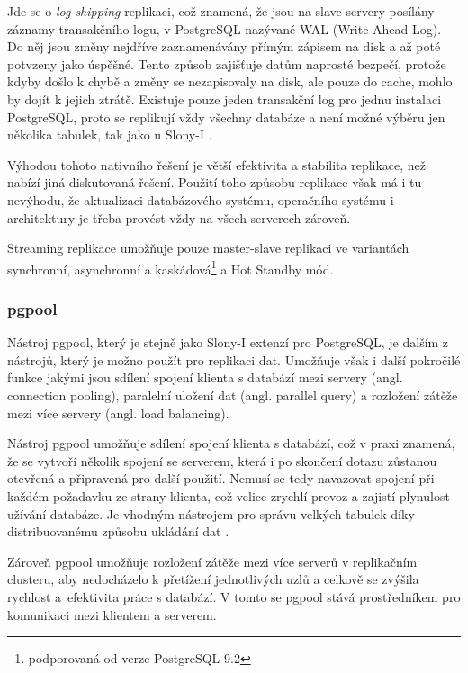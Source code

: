   Jde se o {\it log-shipping} replikaci, což znamená, že jsou na slave servery
  posílány záznamy transakčního logu, v PostgreSQL nazývané WAL (Write Ahead
  Log). Do něj jsou změny nejdříve zaznamenávány přímým zápisem na disk a až
  poté potvzeny jako úspěšné. Tento způsob zajišťuje datům naprosté bezpečí,
  protože kdyby došlo k chybě a změny se nezapisovaly na disk, ale pouze do
  cache, mohlo by dojít k jejich ztrátě. Existuje pouze jeden transakční log
  pro jednu instalaci PostgreSQL, proto se replikují vždy všechny databáze a
  není možné výběru jen několika tabulek, tak jako u Slony-I \citep{Boszormenyi2013}. 
 
  Výhodou tohoto nativního řešení je větší efektivita a stabilita replikace,
  než nabízí jiná diskutovaná řešení. Použití toho způsobu replikace však má i
  tu nevýhodu, že aktualizaci databázového systému, operačního systému i
  architektury je třeba provést vždy na všech serverech zároveň.

  Streaming replikace umožňuje pouze master-slave replikaci ve variantách
  synchronní, asynchronní a kaskádová\footnote{podporovaná od verze PostgreSQL
  9.2} a Hot Standby mód.

      \subsubsection{pgpool}
      \label{kpgpool}

Nástroj pgpool, který je stejně jako Slony-I extenzí pro PostgreSQL, je dalším
z nástrojů, který je možno použít pro replikaci dat. Umožňuje však i další
pokročilé funkce jakými jsou sdílení spojení klienta s databází mezi servery
(angl. connection pooling), paralelní uložení dat (angl. parallel query) a
rozložení zátěže mezi více servery (angl. load balancing). 

Nástroj pgpool umožňuje sdílení spojení klienta s databází, což v praxi
znamená, že se vytvoří několik spojení se serverem, která i po skončení dotazu
zůstanou otevřená a připravená pro další použití. Nemusí se tedy navazovat
spojení při každém požadavku ze strany klienta, což velice zrychlí provoz a
zajistí plynulost užívání databáze. Je vhodným nástrojem pro správu velkých
tabulek díky distribuovanému způsobu ukládání dat \citep{pgpool2014}. 

Zároveň pgpool umožňuje rozložení zátěže mezi více serverů v replikačním
clusteru, aby nedocházelo k přetížení jednotlivých uzlů a celkově se zvýšila
rychlost a~efektivita práce s databází. V tomto se pgpool stává prostředníkem
pro komunikaci mezi klientem a serverem. 


